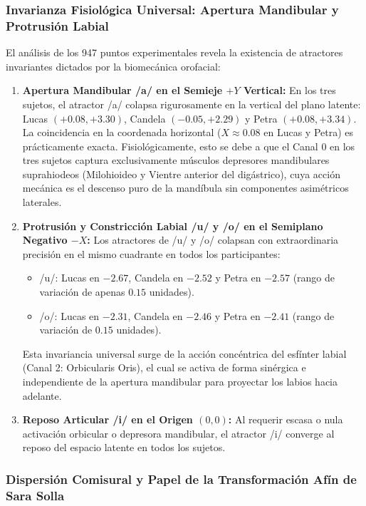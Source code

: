 \documentclass[11pt,a4paper,openany]{book}
\theoremstyle{definition}
\begin{document}
\subsubsection{Invarianza Fisiológica Universal: Apertura Mandibular y Protrusión Labial}
\label{subsubsec:invarianza_fisiologica_universal}

El análisis de los 947 puntos experimentales revela la existencia de atractores invariantes dictados por la biomecánica orofacial:
\begin{enumerate}
    \item \textbf{Apertura Mandibular /a/ en el Semieje $+Y$ Vertical:} En los tres sujetos, el atractor /a/ colapsa rigurosamente en la vertical del plano latente: Lucas $(+0.08, +3.30)$, Candela $(-0.05, +2.29)$ y Petra $(+0.08, +3.34)$. La coincidencia en la coordenada horizontal ($X \approx 0.08$ en Lucas y Petra) es prácticamente exacta. Fisiológicamente, esto se debe a que el Canal 0 en los tres sujetos captura exclusivamente músculos depresores mandibulares suprahiodeos (Milohioideo y Vientre anterior del digástrico), cuya acción mecánica es el descenso puro de la mandíbula sin componentes asimétricos laterales.
    \item \textbf{Protrusión y Constricción Labial /u/ y /o/ en el Semiplano Negativo $-X$:} Los atractores de /u/ y /o/ colapsan con extraordinaria precisión en el mismo cuadrante en todos los participantes:
    \begin{itemize}
        \item /u/: Lucas en $-2.67$, Candela en $-2.52$ y Petra en $-2.57$ (rango de variación de apenas $0.15$ unidades).
        \item /o/: Lucas en $-2.31$, Candela en $-2.46$ y Petra en $-2.41$ (rango de variación de $0.15$ unidades).
    \end{itemize}
    Esta invariancia universal surge de la acción concéntrica del esfínter labial (Canal 2: Orbicularis Oris), el cual se activa de forma sinérgica e independiente de la apertura mandibular para proyectar los labios hacia adelante.
    \item \textbf{Reposo Articular /i/ en el Origen $(0,0)$:} Al requerir escasa o nula activación orbicular o depresora mandibular, el atractor /i/ converge al reposo del espacio latente en todos los sujetos.
\end{enumerate}

\subsubsection{Dispersión Comisural y Papel de la Transformación Afín de Sara Solla}
\label{subsubsec:dispersion_comisural_sara_solla}
\end{document}
